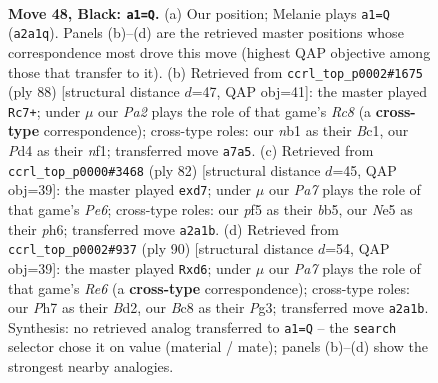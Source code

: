 \documentclass[11pt]{article}
\begin{document}
\clearpage

\begin{figure}[p]\centering
\begin{subfigure}{0.46\textwidth}\centering
\resizebox{\linewidth}{!}{%
\newchessgame
\chessboard[
  setfen={2bk1r2/p5Rp/1P6/4nP2/1p1p4/8/p3P3/1NK5 b - - 3 48},
  showmover=false,
  pgfstyle=straightmove, color=movearrow, markmove={a2-a1}
]}
\caption{}
\end{subfigure}\hfill
\begin{subfigure}{0.46\textwidth}\centering
\resizebox{\linewidth}{!}{%
\newchessgame
\chessboard[
  setfen={2R5/5k1p/3p4/1r6/pP3P2/5P2/Pb1p1N1P/2B2n1K w - - 0 45},
  showmover=false,
  pgfstyle=straightmove, color=movearrow, markmove={c8-c7}
]}
\caption{}
\end{subfigure}
\\[4pt]
\begin{subfigure}{0.46\textwidth}\centering
\resizebox{\linewidth}{!}{%
\newchessgame
\chessboard[
  setfen={6k1/3n1p2/2p1P2p/1b6/r2P1p2/6P1/6BP/2R3K1 w - - 0 42},
  showmover=false,
  pgfstyle=straightmove, color=movearrow, markmove={e6-d7}
]}
\caption{}
\end{subfigure}\hfill
\begin{subfigure}{0.46\textwidth}\centering
\resizebox{\linewidth}{!}{%
\newchessgame
\chessboard[
  setfen={6k1/6p1/3bR2p/p2nP3/3r3P/6P1/3BK3/8 w - - 0 46},
  showmover=false,
  pgfstyle=straightmove, color=movearrow, markmove={e6-d6}
]}
\caption{}
\end{subfigure}
\caption{\textbf{Move 48, Black: \texttt{a1=Q}.} (a) Our position; Melanie plays \texttt{a1=Q} (\texttt{a2a1q}). Panels (b)--(d) are the retrieved master positions whose correspondence most drove this move (highest QAP objective among those that transfer to it). (b) Retrieved from \texttt{ccrl\_top\_p0002\#1675} (ply 88) [structural distance $d$=47, QAP obj=41]: the master played \texttt{Rc7+}; under $\mu$ our \emph{Pa2} plays the role of that game's \emph{Rc8} (a \textbf{cross-type} correspondence); cross-type roles: our \emph{n}b1 as their \emph{B}c1, our \emph{P}d4 as their \emph{n}f1; transferred move \texttt{a7a5}. (c) Retrieved from \texttt{ccrl\_top\_p0000\#3468} (ply 82) [structural distance $d$=45, QAP obj=39]: the master played \texttt{exd7}; under $\mu$ our \emph{Pa7} plays the role of that game's \emph{Pe6}; cross-type roles: our \emph{p}f5 as their \emph{b}b5, our \emph{N}e5 as their \emph{p}h6; transferred move \texttt{a2a1b}. (d) Retrieved from \texttt{ccrl\_top\_p0002\#937} (ply 90) [structural distance $d$=54, QAP obj=39]: the master played \texttt{Rxd6}; under $\mu$ our \emph{Pa7} plays the role of that game's \emph{Re6} (a \textbf{cross-type} correspondence); cross-type roles: our \emph{P}h7 as their \emph{B}d2, our \emph{B}c8 as their \emph{P}g3; transferred move \texttt{a2a1b}. Synthesis: no retrieved analog transferred to \texttt{a1=Q} -- the \texttt{search} selector chose it on value (material / mate); panels (b)--(d) show the strongest nearby analogies.}
\label{fig:thought-m95}
\end{figure}
\end{document}
